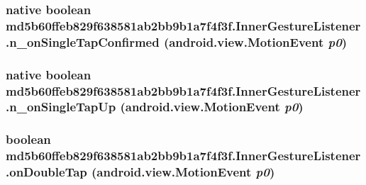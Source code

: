 \hypertarget{classmd5b60ffeb829f638581ab2bb9b1a7f4f3f_1_1_inner_gesture_listener_91f9c46ec0b4d61ff8b2407b107aed2b}{
\subsubsection[{n\_\-onSingleTapConfirmed}]{\setlength{\rightskip}{0pt plus 5cm}native boolean md5b60ffeb829f638581ab2bb9b1a7f4f3f.InnerGestureListener.n\_\-onSingleTapConfirmed (android.view.MotionEvent {\em p0})}}
\label{classmd5b60ffeb829f638581ab2bb9b1a7f4f3f_1_1_inner_gesture_listener_91f9c46ec0b4d61ff8b2407b107aed2b}


\hypertarget{classmd5b60ffeb829f638581ab2bb9b1a7f4f3f_1_1_inner_gesture_listener_2b513c20d2b84f252840e2d071ba9c7d}{
\subsubsection[{n\_\-onSingleTapUp}]{\setlength{\rightskip}{0pt plus 5cm}native boolean md5b60ffeb829f638581ab2bb9b1a7f4f3f.InnerGestureListener.n\_\-onSingleTapUp (android.view.MotionEvent {\em p0})}}
\label{classmd5b60ffeb829f638581ab2bb9b1a7f4f3f_1_1_inner_gesture_listener_2b513c20d2b84f252840e2d071ba9c7d}


\hypertarget{classmd5b60ffeb829f638581ab2bb9b1a7f4f3f_1_1_inner_gesture_listener_8c613557a8dfb0a91caaf5e981d6958f}{
\subsubsection[{onDoubleTap}]{\setlength{\rightskip}{0pt plus 5cm}boolean md5b60ffeb829f638581ab2bb9b1a7f4f3f.InnerGestureListener.onDoubleTap (android.view.MotionEvent {\em p0})}}
\label{classmd5b60ffeb829f638581ab2bb9b1a7f4f3f_1_1_inner_gesture_listener_8c613557a8dfb0a91caaf5e981d6958f}


